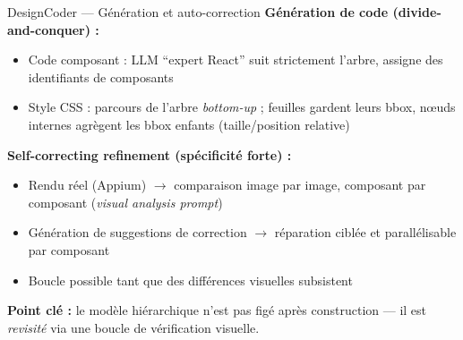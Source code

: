 \documentclass[10pt,aspectratio=169]{beamer}
\begin{document}
\begin{frame}{DesignCoder --- Génération et auto-correction}
\textbf{Génération de code (divide-and-conquer) :}
\begin{itemize}
  \item Code composant : LLM ``expert React'' suit strictement l'arbre, assigne des identifiants de composants
  \item Style CSS : parcours de l'arbre \emph{bottom-up} ; feuilles gardent leurs bbox, n\oe uds internes agrègent les bbox enfants (taille/position relative)
\end{itemize}

\textbf{Self-correcting refinement (spécificité forte) :}
\begin{itemize}
  \item Rendu réel (Appium) $\to$ comparaison image par image, composant par composant (\emph{visual analysis prompt})
  \item Génération de suggestions de correction $\to$ réparation ciblée et parallélisable par composant
  \item Boucle possible tant que des différences visuelles subsistent
\end{itemize}
\textbf{Point clé :} le modèle hiérarchique n'est pas figé après construction — il est \emph{revisité} via une boucle de vérification visuelle.
\end{frame}

\end{document}
